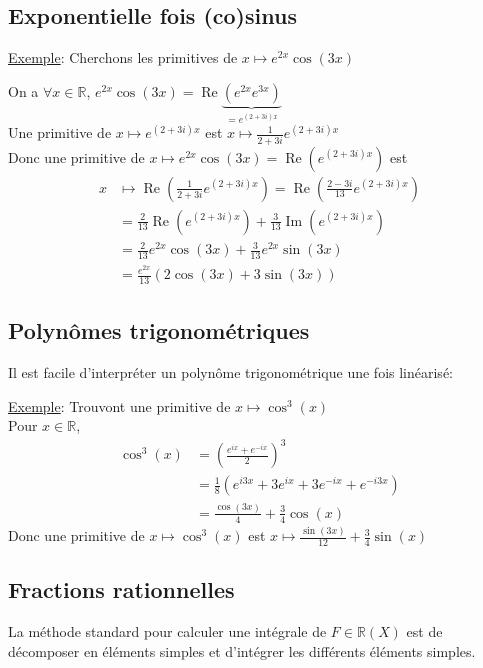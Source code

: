 \documentclass[10pt,a4paper]{article}
\theoremstyle{definition}
\DeclareMathOperator{\re}{Re}
\DeclareMathOperator{\im}{Im}
\begin{document}
\subsection{Exponentielle fois (co)sinus}
\noindent \uline{Exemple}: Cherchons les primitives de $x \mapsto e^{2x} \cos(3x)$ \medskip

\noindent On a $\forall x \in \mathbb{R}$, $e^{2x} \cos(3x) = \re\underbrace{(e^{2x} e^{3x})}_{= e^{(2 + 3i)x}}$ \\
Une primitive de $x \mapsto e^{(2 + 3i)x}$ est $x \mapsto \frac{1}{2 + 3i} e^{(2 + 3i)x}$ \\
Donc une primitive de $x \mapsto e^{2x} \cos(3x) = \re(e^{(2 + 3i)x})$ est
\begin{align*}
x &\mapsto \re\left(\frac{1}{2 + 3i}e^{(2 + 3i)x}\right) = \re\left(\frac{2 - 3i}{13} e^{(2 + 3i)x} \right)\\
&= \frac{2}{13}\re\left(e^{(2 + 3i)x}\right) + \frac{3}{13}\im\left(e^{(2 + 3i)x}\right) \\
&= \frac{2}{13}e^{2x}\cos(3x) + \frac{3}{13}e^{2x}\sin(3x) \\
&= \frac{e^{2x}}{13}(2 \cos(3x) + 3 \sin(3x))
\end{align*}

\subsection{Polynômes trigonométriques}
Il est facile d'interpréter un polynôme trigonométrique une fois linéarisé: \medskip

\noindent \uline{Exemple}: Trouvont une primitive de $x \mapsto \cos^3(x)$ \\
Pour $x \in \mathbb{R}$,
\begin{align*}
\cos^3(x) &= \left(\frac{e^{ix} + e^{-ix}}{2}\right)^3 \\
&= \frac{1}{8}(e^{i3x} + 3e^{ix} + 3e^{-ix} + e^{-i3x}) \\
&= \frac{\cos(3x)}{4} + \frac{3}{4}\cos(x)
\end{align*}
Donc une primitive de $x \mapsto \cos^3(x)$ est $x \mapsto \frac{\sin(3x)}{12} + \frac{3}{4}\sin(x)$

\subsection{Fractions rationnelles}
La méthode standard pour calculer une intégrale de $F \in \mathbb{R}(X)$ est de décomposer en éléments simples et d'intégrer les différents éléments simples. \medskip
\end{document}
